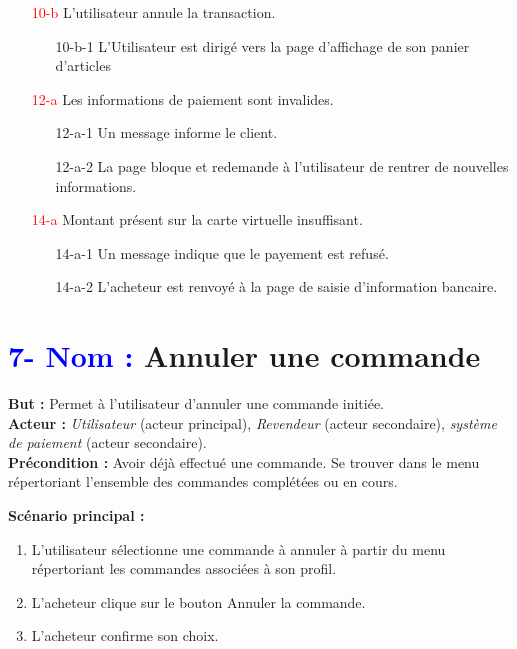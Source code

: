 \documentclass[16pt]{report}
\begin{document}
\begin{enumerate}[leftmargin=4em]
         \item[\textcolor{red}{10-b}] L’utilisateur annule la transaction.
            \begin{enumerate}
            \item[10-b-1] L’Utilisateur est dirigé vers la page d’affichage de son panier d’articles
            \end{enumerate}
        \item[\textcolor{red}{12-a}] Les informations de paiement sont invalides.
            \begin{enumerate}    
            \item[12-a-1] Un message informe le client.
            \item[12-a-2] La page bloque et redemande à l’utilisateur de rentrer de nouvelles informations.
            \end{enumerate}
        \item[\textcolor{red}{14-a}] Montant présent sur la carte virtuelle insuffisant.
            \begin{enumerate}
            \item[14-a-1] Un message indique que le payement est refusé.
            \item[14-a-2] L’acheteur est renvoyé à la page de saisie d’information bancaire.
            \end{enumerate}

\end{enumerate}


\section*{\textbf{\textcolor{blue}{7- Nom :}} Annuler une commande}

\textbf{But :} Permet à l'utilisateur d'annuler une commande initiée. \\
\textbf{Acteur :} \textit{Utilisateur} (acteur principal), \textit{Revendeur} (acteur secondaire), \textit{système de paiement} (acteur secondaire). \\
\textbf{Précondition :} Avoir déjà effectué une commande. Se trouver dans le menu répertoriant l'ensemble des commandes complétées ou en cours.

\textbf{Scénario principal :}
\begin{enumerate}[leftmargin=4em]
    \item L’utilisateur sélectionne une commande à annuler à partir du menu répertoriant les commandes associées à son profil.
    \item L’acheteur clique sur le bouton Annuler la commande.
    \item L’acheteur confirme son choix.
\end{enumerate}
\end{document}
